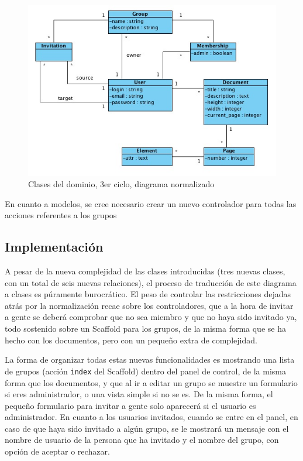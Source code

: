 \begin{figure}[h!]
\centering
\includegraphics[width=14cm]{uml3n.png}
\caption{Clases del dominio, 3er ciclo, diagrama normalizado}\label{fig:uml3n}
\end{figure}

En cuanto a modelos, se cree necesario crear un nuevo controlador para todas las acciones referentes a los grupos


\subsection{Implementación} %
\label{sub:implementación}

A pesar de la nueva complejidad de las clases introducidas (tres nuevas clases, con un total de seis nuevas relaciones), el proceso de traducción de este diagrama a clases es púramente burocrático. El peso de controlar las restricciones dejadas atrás por la normalización recae sobre los controladores, que a la hora de invitar a gente se deberá comprobar que no sea miembro y que no haya sido invitado ya, todo sostenido sobre un Scaffold para los grupos, de la misma forma que se ha hecho con los documentos, pero con un pequeño extra de complejidad.

La forma de organizar todas estas nuevas funcionalidades es mostrando una lista de grupos (acción \texttt{index} del Scaffold) dentro del panel de control, de la misma forma que los documentos, y que al ir a editar un grupo se muestre un formulario si eres administrador, o una vista simple si no se es. De la misma forma, el pequeño formulario para invitar a gente solo aparecerá si el usuario es administrador. En cuanto a los usuarios invitados, cuando se entre en el panel, en caso de que haya sido invitado a algún grupo, se le mostrará un mensaje con el nombre de usuario de la persona que ha invitado y el nombre del grupo, con opción de aceptar o rechazar.


